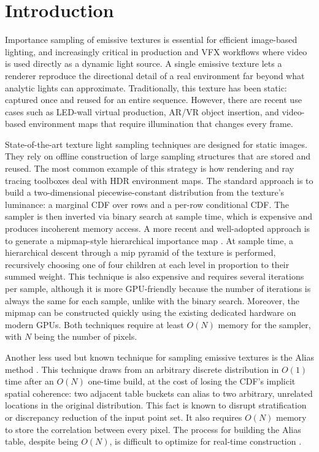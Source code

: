 \documentclass[acmtog,review,anonymous]{acmart}
\begin{document}
\maketitle

\section{Introduction}

Importance sampling of emissive textures is essential for efficient image-based lighting, and increasingly critical in production and VFX workflows where video is used directly as a dynamic light source. A single emissive texture lets a renderer reproduce the directional detail of a real environment far beyond what analytic lights can approximate. Traditionally, this texture has been static: captured once and reused for an entire sequence. However, there are recent use cases such as LED-wall virtual production, AR/VR object insertion, and video-based environment maps that require illumination that changes every frame.

State-of-the-art texture light sampling techniques are designed for static images. They rely on offline construction of large sampling structures that are stored and reused. The most common example of this strategy is how rendering and ray tracing toolboxes deal with HDR environment maps. The standard approach is to build a two-dimensional piecewise-constant distribution from the texture's luminance: a marginal CDF over rows and a per-row conditional CDF. The sampler is then inverted via binary search at sample time, which is expensive and produces incoherent memory access. A more recent and well-adopted approach is to generate a mipmap-style hierarchical importance map \cite{clarberg2005wavelet}. At sample time, a hierarchical descent through a mip pyramid
of the texture is performed, recursively choosing one of four children at each level in proportion to their summed weight. This technique is also expensive and requires several iterations per sample, although it is more GPU-friendly because the number of iterations is always the same for each sample, unlike with the binary search. Moreover, the mipmap can be constructed quickly using the existing dedicated hardware on modern GPUs. Both techniques require at least $O(N)$ memory for the sampler, with $N$ being the number of pixels.

Another less used but known technique for sampling emissive textures is the Alias method \cite{burke2004bidirectional}. This technique draws from an arbitrary discrete distribution in $O(1)$ time after an $O(N)$ one-time build, at the cost of losing the CDF's implicit spatial coherence: two adjacent table buckets can alias to two arbitrary, unrelated locations in the original distribution. This fact is known to disrupt stratification or discrepancy reduction of the input point set. It also requires $O(N)$ memory to store the correlation between every pixel. The process for building the Alias table, despite being $O(N)$, is difficult to optimize for real-time construction \cite{lehmann2021weighted}. 
\end{document}
